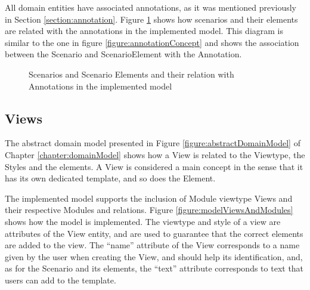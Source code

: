 All domain entities have associated annotations, as it was mentioned previously in Section \ref{section:annotation}. Figure \ref{figure:modelScenariosAnnotations} shows how scenarios and their elements are related with the annotations in the implemented model. This diagram is similar to the one in figure \ref{figure:annotationConcept} and shows the association between the Scenario and ScenarioElement with the Annotation.

\begin{figure}
\centering
\renewcommand {\umltextcolor}{black}
\renewcommand {\umlfillcolor}{none}
\renewcommand {\umldrawcolor}{black}

\caption{Scenarios and Scenario Elements and their relation with Annotations in the implemented model}
\label{figure:modelScenariosAnnotations}
\end{figure}

\subsection{Views}
\label{subsection:modelViews}

The abstract domain model presented in Figure \ref{figure:abstractDomainModel} of Chapter \ref{chapter:domainModel} shows how a View is related to the Viewtype, the Styles and the elements. A View is considered a main concept in the sense that it has its own dedicated template, and so does the Element.

The implemented model supports the inclusion of Module viewtype Views and their respective Modules and relations. Figure \ref{figure:modelViewsAndModules} shows how the model is implemented. The viewtype and style of a view are attributes of the View entity, and are used to guarantee that the correct elements are added to the view. The ``name'' attribute of the View corresponds to a name given by the user when creating the View, and should help its identification, and, as for the Scenario and its elements, the ``text'' attribute corresponds to text that users can add to the template.

